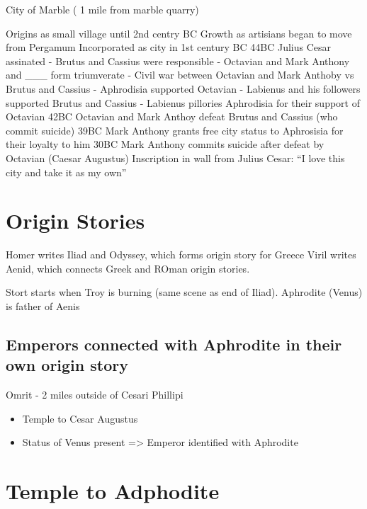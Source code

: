 \documentclass[
]{book}
\providecommand{\tightlist}{%
  \setlength{\itemsep}{0pt}\setlength{\parskip}{0pt}}
\begin{document}
City of Marble ( 1 mile from marble quarry)

Origins as small village until 2nd centry BC
Growth as artisians began to move from Pergamum
Incorporated as city in 1st century BC
44BC Julius Cesar assinated
- Brutus and Cassius were responsible
- Octavian and Mark Anthony and \_\_\_ form triumverate
- Civil war between Octavian and Mark Anthoby vs Brutus and Cassius
- Aphrodisia supported Octavian
- Labienus and his followers supported Brutus and Cassius
- Labienus pillories Aphrodisia for their support of Octavian
42BC Octavian and Mark Anthoy defeat Brutus and Cassius (who commit suicide)
39BC Mark Anthony grants free city status to Aphrosisia for their loyalty to him
30BC Mark Anthony commits suicide after defeat by Octavian (Caesar Augustus)
Inscription in wall from Julius Cesar: ``I love this city and take it as my own''

\hypertarget{origin-stories}{%
\section{Origin Stories}\label{origin-stories}}

Homer writes Iliad and Odyssey, which forms origin story for Greece
Viril writes Aenid, which connects Greek and ROman origin stories.

Stort starts when Troy is burning (same scene as end of Iliad).
Aphrodite (Venus) is father of Aenis

\hypertarget{emperors-connected-with-aphrodite-in-their-own-origin-story}{%
\subsection{Emperors connected with Aphrodite in their own origin story}\label{emperors-connected-with-aphrodite-in-their-own-origin-story}}

Omrit - 2 miles outside of Cesari Phillipi

\begin{itemize}
\tightlist
\item
  Temple to Cesar Augustus
\item
  Status of Venus present
  =\textgreater{} Emperor identified with Aphrodite
\end{itemize}

\hypertarget{temple-to-adphodite}{%
\section{Temple to Adphodite}\label{temple-to-adphodite}}
\end{document}
